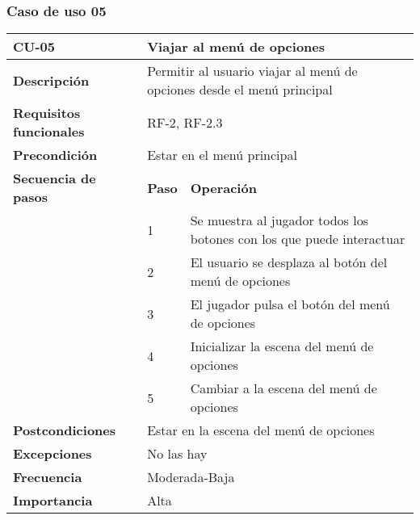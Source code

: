 \subsubsection{Caso de uso 05}
\begin{longtable}{lll}
\textbf{CU-05}                                   & \multicolumn{2}{l}{Viajar al menú de opciones}                                             \\ \hline
\endfirsthead
%
\endhead
%
\textbf{Descripción}                             & \multicolumn{2}{l}{Permitir al usuario viajar al menú de opciones desde el menú principal} \\ \hline
\textbf{Requisitos funcionales}                  & \multicolumn{2}{l}{RF-2, RF-2.3}                                                           \\ \hline
\textbf{Precondición}                            & \multicolumn{2}{l}{Estar en el menú principal}                                             \\ \hline
\multicolumn{1}{l|}{\textbf{Secuencia de pasos}} & \textbf{Paso}    & \textbf{Operación}                                                      \\ \cline{2-3} 
\multicolumn{1}{l|}{}                            & 1                & Se muestra al jugador todos los botones con los que puede interactuar   \\
\multicolumn{1}{l|}{}                            & 2                & El usuario se desplaza al botón del menú de opciones                    \\
\multicolumn{1}{l|}{}                            & 3                & El jugador pulsa el botón del menú de opciones                          \\
\multicolumn{1}{l|}{}                            & 4                & Inicializar la escena del menú de opciones                              \\
\multicolumn{1}{l|}{}                                                 & 5                & Cambiar a la escena del menú de opciones                                \\ \hline
\textbf{Postcondiciones}                         & \multicolumn{2}{l}{Estar en la escena del menú de opciones}                                \\ \hline
\textbf{Excepciones}                             & \multicolumn{2}{l}{No las hay}                                                             \\ \hline
\textbf{Frecuencia}                              & \multicolumn{2}{l}{Moderada-Baja}                                                          \\ \hline
\textbf{Importancia}                             & \multicolumn{2}{l}{Alta}                                                                   \\ \hline
\end{longtable}

